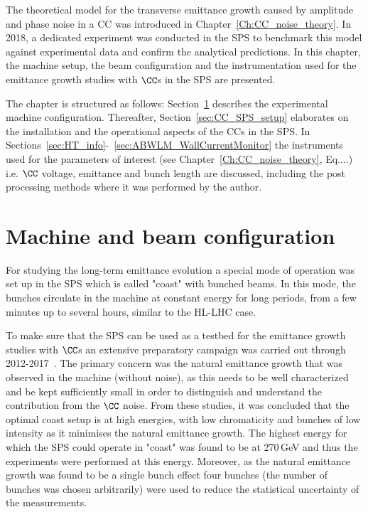 \vspace*{-1mm}
The theoretical model for the transverse emittance growth caused by amplitude and phase noise in a CC was introduced in Chapter~\ref{Ch:CC_noise_theory}. In 2018, a dedicated experiment was conducted in the SPS to benchmark this model against experimental data and confirm the analytical predictions. In this chapter, the machine setup, the beam configuration and the instrumentation used for the emittance growth studies with $\CC$s in the SPS are presented.


\begin{sloppypar} %
The chapter is structured as follows: Section~\ref{sec:SPS_setup}
describes the experimental machine configuration. Thereafter, Section~\ref{sec:CC_SPS_setup} elaborates on the installation and the operational aspects of the CCs in the SPS. In Sections~\ref{sec:HT_info}-~\ref{sec:ABWLM_WallCurrentMonitor} the instruments used for the parameters of interest (see Chapter~\ref{Ch:CC_noise_theory}, Eq....) i.e. $\CC$ voltage, emittance and bunch length are discussed, including the post processing methods where it was performed by the author.
\end{sloppypar}


\section{Machine and beam configuration}\label{sec:SPS_setup}

For studying the long-term emittance evolution a special mode of operation was set up in the SPS which is called "coast" with bunched beams. In this mode, the bunches circulate in the machine at constant energy for long periods, from a few minutes up to several hours, similar to the HL-LHC case.

To make sure that the SPS can be used as a testbed for the emittance growth studies with $\CC$s an extensive preparatory campaign was carried out through 2012-2017~\cite{Calaga:1451286, Alekou_CC_coast_prep_2016, Antoniou:2649815}. The primary concern was the natural emittance growth that was observed in the machine (without noise), as this needs to be well characterized and be kept sufficiently small in order to distinguish and understand the contribution from the $\CC$ noise. From these studies, it was concluded that the optimal coast setup is at high energies, with low chromaticity and bunches of low intensity as it minimises the natural emittance growth. The highest energy for which the SPS could operate in "coast" was found to be at 270\,GeV and thus the experiments were performed at this energy. Moreover, as the natural emittance growth was found to be a single bunch effect four bunches (the number of bunches was chosen arbitrarily) were used to reduce the statistical uncertainty of the measurements.

